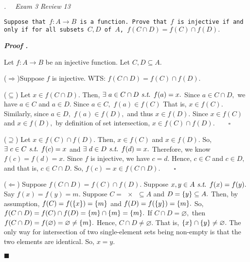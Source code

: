 \documentclass[11pt,letter]{article}
\newcounter{nq}[section]
\newcounter{np}[section]
\newenvironment*{p}{\par\noindent\textbf{\textit{Proof \stepcounter{np}\thenp. }}\par}{\par\hfill $\blacksquare$\par}
\newenvironment*{q}[1]{\noindent\emph{\thesection.\stepcounter{nq}\thenq$\quad $ #1}\par\noindent\texttt}{}
\def\emptyset{\varnothing}
\def\st{\emph{ s.t. }}
\begin{document}
\begin{framed}\begin{q}
	{Exam 3 Review 13}
	{Suppose that $f:A\to B$ is a function. Prove that $f$ is injective if and only if for all subsets $C,D$ of $A$, $f(C\cap D)=f(C)\cap f(D).$}
\end{q}\end{framed}
\begin{p}
	Let $f:A\to B$ be an injective function. Let $C,D\subseteq A.$\par 
	($\Rightarrow$)Suppose $f$ is injective. WTS: $f(C\cap D)=f(C)\cap f(D).$\par 
	\indent\indent($\subseteq$) Let $x\in f(C\cap D).$ Then, $\exists\ a\in C\cap D\st f(a)=x.$ Since $a\in C\cap D,$ we have $a\in C$ and $a\in D.$ Since $a\in C,$ $f(a)\in f(C)$ That is, $x\in f(C).$ Similarly, since $a\in D,$ $f(a)\in f(D),$ and thus $x\in f(D).$ Since $x\in f(C)$ and $x\in f(D),$ by definition of set intersection, $x\in f(C)\cap f(D).\qquad\square$\par 
	\indent\indent ($\supseteq$) Let $x\in f(C)\cap f(D).$ Then, $x\in f(C)$ and $x\in f(D).$ So, $\exists\ c\in C\st f(c)=x$ and $\exists\ d\in D\st f(d)=x.$ Therefore, we know $f(c)=f(d)=x.$ Since $f$ is injective, we have $c=d.$ Hence, $c\in C$ and $c\in D,$ and that is, $c\in C\cap D.$ So, $f(c)=x\in f(C\cap D).\qquad\square$\par 
	($\Leftarrow$) Suppose $f(C\cap D)=f(C)\cap f(D).$ Suppose $x,y\in A\st f(x)=f(y).$ Say $f(x)=f(y)=m.$ Suppose $C=\qty{x}\subseteq A$ and $D=\qty{y}\subseteq A.$ Then, by assumption, $f(C)=f(\qty{x})=\qty{m}$ and $f(D)=f(\qty{y})=\qty{m}.$ So, $f(C\cap D)=f(C)\cap f(D)=\qty{m}\cap\qty{m}=\qty{m}.$ If $C\cap D=\emptyset,$ then $f(C\cap D)=f(\emptyset)=\emptyset\neq\qty{m}.$ Hence, $C\cap D\neq\emptyset.$ That is, $\qty{x}\cap\qty{y}\neq\emptyset.$ The only way for intersection of two single-element sets being non-empty is that the two elements are identical. So, $x=y.$
\end{p}
\end{document}
